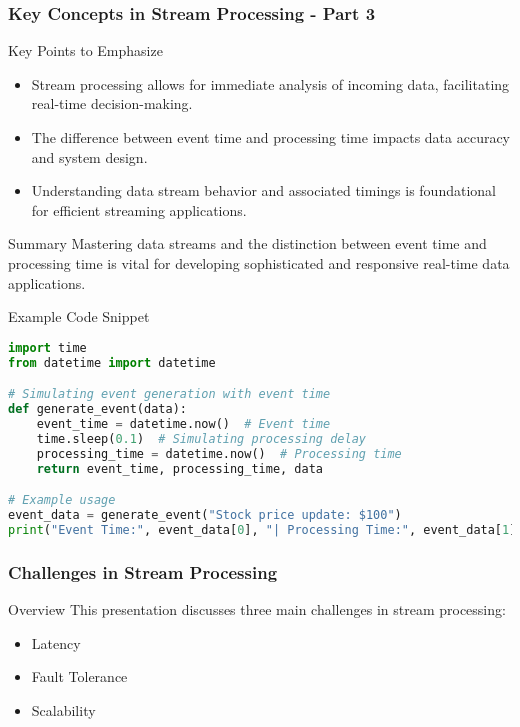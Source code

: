 \documentclass[aspectratio=169]{beamer}
\begin{document}
\begin{frame}[fragile]
    \frametitle{Key Concepts in Stream Processing - Part 3}
    \begin{block}{Key Points to Emphasize}
        \begin{itemize}
            \item Stream processing allows for immediate analysis of incoming data, facilitating real-time decision-making.
            \item The difference between event time and processing time impacts data accuracy and system design.
            \item Understanding data stream behavior and associated timings is foundational for efficient streaming applications.
        \end{itemize}
    \end{block}

    \begin{block}{Summary}
        Mastering data streams and the distinction between event time and processing time is vital for developing sophisticated and responsive real-time data applications.
    \end{block}

    \begin{block}{Example Code Snippet}
        \begin{lstlisting}[language=Python]
import time
from datetime import datetime

# Simulating event generation with event time
def generate_event(data):
    event_time = datetime.now()  # Event time
    time.sleep(0.1)  # Simulating processing delay
    processing_time = datetime.now()  # Processing time
    return event_time, processing_time, data

# Example usage
event_data = generate_event("Stock price update: $100")
print("Event Time:", event_data[0], "| Processing Time:", event_data[1])
        \end{lstlisting}
    \end{block}
\end{frame}

\begin{frame}[fragile]
    \frametitle{Challenges in Stream Processing}
    \begin{block}{Overview}
        This presentation discusses three main challenges in stream processing:
        \begin{itemize}
            \item Latency
            \item Fault Tolerance
            \item Scalability
        \end{itemize}
    \end{block}
\end{frame}
\end{document}
